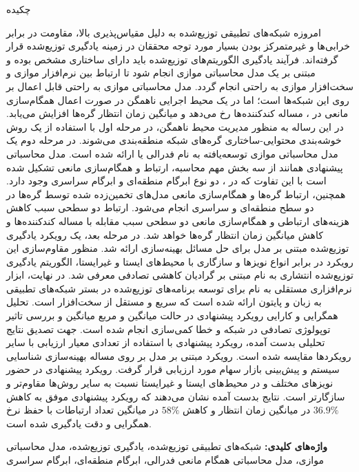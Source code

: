 \def\title{\large{چکیده}}
\def\keyword{واژه‌های کلیدی: }
\def\abstractfa{ 
	
	امروزه شبکه‌های تطبیقی توزیع‌شده به دلیل مقیاس‌پذیری بالا، مقاومت در برابر خرابی‌ها و غیرمتمرکز بودن بسیار مورد توجه محققان در زمینه یادگیری توزیع‌شده قرار گرفته‌اند. فرآیند یادگیری الگوریتم‌های توزیع‌شده باید دارای ساختاری مشخص بوده و مبتنی بر یک مدل محاسباتی موازی انجام شود تا ارتباط بین نرم‌افزار موازی و سخت‌افزار موازی به راحتی انجام گردد. مدل محاسباتی موازی \lr{BSP} به راحتی قابل اعمال بر روی این شبکه‌ها است؛ اما در یک محیط اجرایی ناهمگن در صورت اعمال همگام‌سازی مانعی در \lr{BSP}، مساله کندکننده‌ها رخ می‌دهد و میانگین زمان انتظار گره‌ها افزایش می‌یابد. در این رساله به منظور مدیریت محیط ناهمگن، در مرحله اول با استفاده از یک روش خو‌شه‌بندی محتوایی-ساختاری گره‌های شبکه منطقه‌بندی می‌شوند. در مرحله دوم یک مدل محاسباتی موازی توسعه‌یافته به نام \lr{BSP} فدرالی یا \lr{FBSP} ارائه شده است. مدل محاسباتی پیشنهادی همانند \lr{BSP} از سه بخش مهم محاسبه، ارتباط و همگام‌سازی مانعی تشکیل شده است با این تفاوت که در \lr{FBSP}، دو نوع ابرگام منطقه‌ای و ابرگام سراسری وجود دارد. همچنین، ارتباط گره‌ها و همگام‌سازی مانعی مدل‌های تخمین‌زده شده توسط گره‌ها در دو سطح منطقه‌ای و سراسری انجام می‌شود. ارتباط دو سطحی سبب کاهش هزینه‌های ارتباطی و همگام‌سازی مانعی دو سطحی سبب مقابله با مساله کندکننده‌ها و کاهش میانگین زمان انتظار گره‌ها خواهد شد. در مرحله بعد، یک رویکرد یادگیری توزیع‌شده مبتنی بر مدل \lr{FBSP} برای حل مسائل بهینه‌سازی ارائه شد. منظور مقاوم‌سازی این رویکرد در برابر انواع نویزها و سازگاری با محیط‌های ایستا و غیرایستا، الگوریتم یادگیری توزیع‌شده انتشاری به نام \lr{RDSGD} مبتنی بر گرادیان کاهشی تصادفی معرفی شد. در نهایت، ابزار نرم‌افزاری مستقلی به نام \lr{FBSPonMPI} برای توسعه برنامه‌های توزیع‌شده در بستر شبکه‌های تطبیقی به زبان \lr{C} و پایتون ارائه شده است که سریع و مستقل از سخت‌افزار است. تحلیل همگرایی و کارایی رویکرد پیشنهادی در حالت میانگین و مربع میانگین و بررسی تاثیر توپولوژی تصادفی در شبکه و خطا کمی‌سازی انجام شده است. جهت تصدیق نتایج تحلیلی بدست آمده، رویکرد پیشنهادی با استفاده از تعدادی معیار ارزیابی با سایر رویکرد‌ها مقایسه شده است. رویکرد مبتنی بر مدل \lr{FBSP} بر روی مساله بهینه‌سازی شناسایی سیستم و پیش‌بینی بازار سهام مورد ارزیابی قرار گرفت. رویکرد پیشنهادی در حضور نویزهای مختلف و در محیط‌های ایستا و غیرایستا نسبت به سایر روش‌ها مقاوم‌تر و سازگارتر است. نتایج بدست آمده نشان می‌دهند که رویکرد پیشنهادی موفق به کاهش $36.9\%$ در میانگین زمان انتظار و کاهش $58\%$ در میانگین تعداد ارتباطات با حفظ نرخ همگرایی و دقت یادگیری شده است.
}
\def\keywordfa{شبکه‌های تطبیقی‌ توزیع‌شده، یادگیری توزیع‌شده، مدل‌ محاسباتی موازی، مدل محاسباتی همگام مانعی فدرالی، ابرگام منطقه‌ای، ابرگام سراسری}

\begin{center}
\title
\end{center}
\abstractfa

\textbf{واژه‌های کلیدی:}
\keywordfa